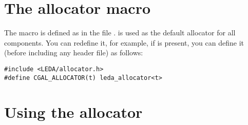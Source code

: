 



%

\section{The allocator macro\label{sec:allocator_macro}}

The macro 
is defined as  in the file .
 is used
as the default allocator for all \cgal{} components. You can redefine it,
for example, if \leda{} is present, you can define it (before including
any \cgal{} header file) as follows:

\begin{verbatim}
#include <LEDA/allocator.h>
#define CGAL_ALLOCATOR(t) leda_allocator<t>
\end{verbatim}

\section{Using the allocator\label{sec:using_memory_allocator}}

